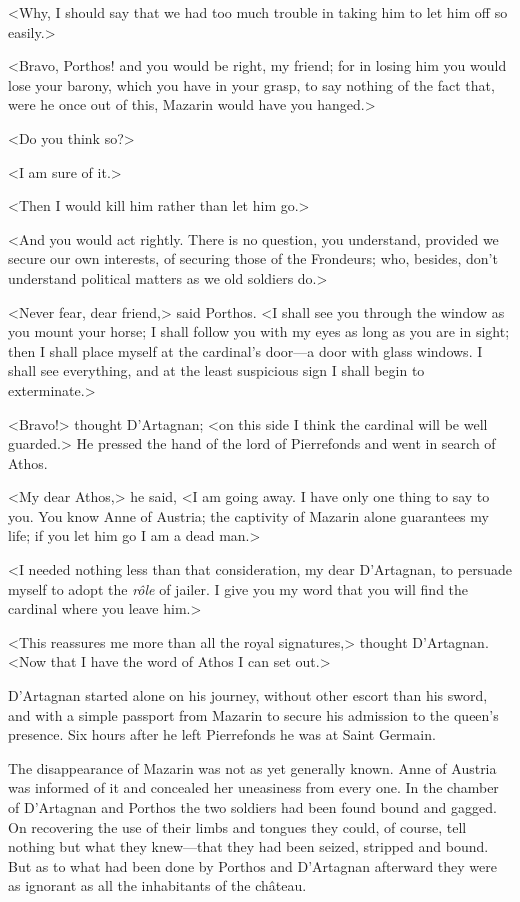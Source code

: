 <Why, I should say that we had too much trouble in taking him to let him off so easily.>

<Bravo, Porthos! and you would be right, my friend; for in losing him you would lose your barony, which you have in your grasp, to say nothing of the fact that, were he once out of this, Mazarin would have you hanged.>

<Do you think so?>

<I am sure of it.>

<Then I would kill him rather than let him go.>

<And you would act rightly. There is no question, you understand, provided we secure our own interests, of securing those of the Frondeurs; who, besides, don't understand political matters as we old soldiers do.>

<Never fear, dear friend,> said Porthos. <I shall see you through the window as you mount your horse; I shall follow you with my eyes as long as you are in sight; then I shall place myself at the cardinal's door—a door with glass windows. I shall see everything, and at the least suspicious sign I shall begin to exterminate.>

<Bravo!> thought D'Artagnan; <on this side I think the cardinal will be well guarded.> He pressed the hand of the lord of Pierrefonds and went in search of Athos.

<My dear Athos,> he said, <I am going away. I have only one thing to say to you. You know Anne of Austria; the captivity of Mazarin alone guarantees my life; if you let him go I am a dead man.>

<I needed nothing less than that consideration, my dear D'Artagnan, to persuade myself to adopt the \textit{rôle} of jailer. I give you my word that you will find the cardinal where you leave him.>

<This reassures me more than all the royal signatures,> thought D'Artagnan. <Now that I have the word of Athos I can set out.>

D'Artagnan started alone on his journey, without other escort than his sword, and with a simple passport from Mazarin to secure his admission to the queen's presence. Six hours after he left Pierrefonds he was at Saint Germain.

The disappearance of Mazarin was not as yet generally known. Anne of Austria was informed of it and concealed her uneasiness from every one. In the chamber of D'Artagnan and Porthos the two soldiers had been found bound and gagged. On recovering the use of their limbs and tongues they could, of course, tell nothing but what they knew—that they had been seized, stripped and bound. But as to what had been done by Porthos and D'Artagnan afterward they were as ignorant as all the inhabitants of the château.

